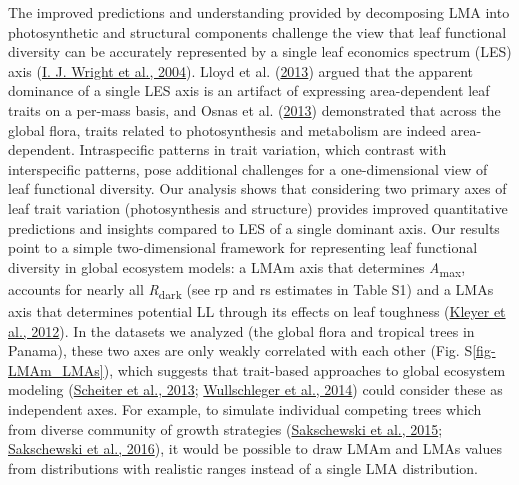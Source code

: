 \documentclass[
  12pt,
  a4paper,
,tablecaptionabove
]{scrartcl}
\begin{document}
The improved predictions and understanding provided by decomposing LMA
into photosynthetic and structural components challenge the view that
leaf functional diversity can be accurately represented by a single leaf
economics spectrum (LES) axis (\protect\hyperlink{ref-Wright2004a}{I. J.
Wright et al., 2004}). Lloyd et al.
(\protect\hyperlink{ref-Lloyd2013}{2013}) argued that the apparent
dominance of a single LES axis is an artifact of expressing
area-dependent leaf traits on a per-mass basis, and Osnas et al.
(\protect\hyperlink{ref-Osnas2013}{2013}) demonstrated that across the
global flora, traits related to photosynthesis and metabolism are indeed
area-dependent. Intraspecific patterns in trait variation, which
contrast with interspecific patterns, pose additional challenges for a
one-dimensional view of leaf functional diversity. Our analysis shows
that considering two primary axes of leaf trait variation
(photosynthesis and structure) provides improved quantitative
predictions and insights compared to LES of a single dominant axis. Our
results point to a simple two-dimensional framework for representing
leaf functional diversity in global ecosystem models: a LMAm axis that
determines \emph{A}\textsubscript{max}, accounts for nearly all
\emph{R}\textsubscript{dark} (see rp and rs estimates in Table S1) and a
LMAs axis that determines potential LL through its effects on leaf
toughness (\protect\hyperlink{ref-Kleyer2012}{Kleyer et al., 2012}). In
the datasets we analyzed (the global flora and tropical trees in
Panama), these two axes are only weakly correlated with each other (Fig.
S\ref{fig-LMAm_LMAs}), which suggests that trait-based approaches to
global ecosystem modeling (\protect\hyperlink{ref-Scheiter2013}{Scheiter
et al., 2013}; \protect\hyperlink{ref-Wullschleger2014}{Wullschleger et
al., 2014}) could consider these as independent axes. For example, to
simulate individual competing trees which from diverse community of
growth strategies (\protect\hyperlink{ref-Sakschewski2015}{Sakschewski
et al., 2015}; \protect\hyperlink{ref-Sakschewski2016}{Sakschewski et
al., 2016}), it would be possible to draw LMAm and LMAs values from
distributions with realistic ranges instead of a single LMA
distribution.
\end{document}
